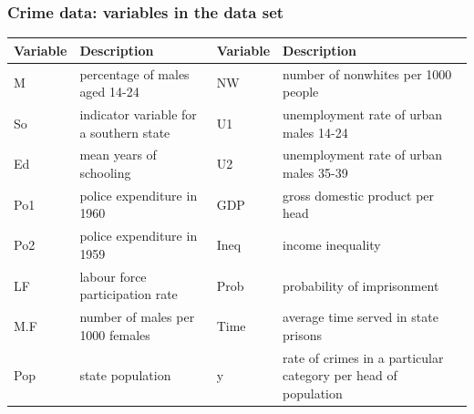 \documentclass[a4paper]{article}\usepackage[]{graphicx}\usepackage[]{xcolor}
\begin{document}
\subsubsection{Crime data: variables in the data set}
\begin{table}[H]
	\centering
	\begin{tabularx}{\textwidth}{@{}lXlX@{}}
	\toprule
	\textbf{Variable} & \textbf{Description}                    & \textbf{Variable} & \textbf{Description}                                           \\ \midrule
	M                 & percentage of males aged 14-24          & NW                & number of nonwhites per 1000 people                            \\
	So                & indicator variable for a southern state & U1                & unemployment rate of urban males 14-24                         \\
	Ed                & mean years of schooling                 & U2                & unemployment rate of urban males 35-39                         \\
	Po1               & police expenditure in 1960              & GDP               & gross domestic product per head                                \\
	Po2               & police expenditure in 1959              & Ineq              & income inequality                                              \\
	LF                & labour force participation rate         & Prob              & probability of imprisonment                                    \\
	M.F               & number of males per 1000 females        & Time              & average time served in state prisons                           \\
	Pop               & state population                        & y                 & rate of crimes in a particular category per head of population \\ \bottomrule
	\end{tabularx}
\end{table}
\end{document}
